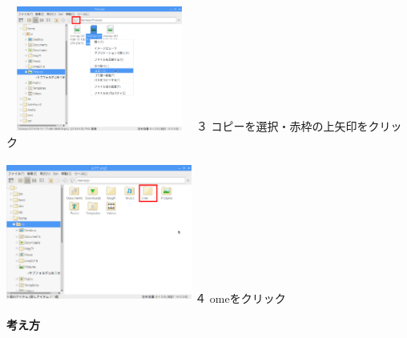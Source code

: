 \documentclass[a4paper,12pt]{jarticle}
\begin{document}
\begin{minipage}{6.413cm}
\includegraphics[width=6.146cm,height=4.114cm]{textbook-img163.png}
\newline
３
コピーを選択・赤枠の上矢印をクリック
\end{minipage}
	\hspace{10mm}
\begin{minipage}{6.5cm}
\includegraphics[width=6.1cm,height=4.646cm]{textbook-img165.png}
\newline
４ omeをクリック
\end{minipage}

\clearpage
\flushleft

\textbf{考え方}


\bigskip


\bigskip


\bigskip
\end{document}
